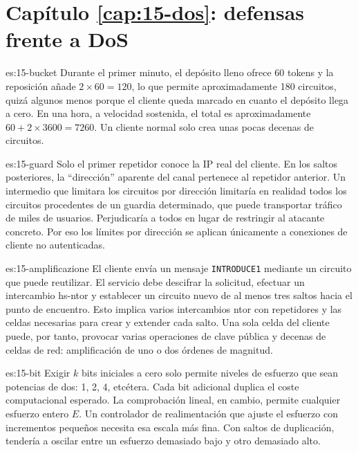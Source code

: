 \section*{Capítulo \ref{cap:15-dos}: defensas frente a DoS}

\begin{soluzione}{es:15-bucket}
Durante el primer minuto, el depósito lleno ofrece 60 tokens y la reposición añade $2\times60=120$, lo que permite aproximadamente 180 circuitos, quizá algunos menos porque el cliente queda marcado en cuanto el depósito llega a cero. En una hora, a velocidad sostenida, el total es aproximadamente $60+2\times3600=7260$. Un cliente normal solo crea unas pocas decenas de circuitos.
\end{soluzione}

\begin{soluzione}{es:15-guard}
Solo el primer repetidor conoce la IP real del cliente. En los saltos posteriores, la \enquote{dirección} aparente del canal pertenece al repetidor anterior. Un intermedio que limitara los circuitos por dirección limitaría en realidad todos los circuitos procedentes de un guardia determinado, que puede transportar tráfico de miles de usuarios. Perjudicaría a todos en lugar de restringir al atacante concreto. Por eso los límites por dirección se aplican únicamente a conexiones de cliente no autenticadas.
\end{soluzione}

\begin{soluzione}{es:15-amplificazione}
El cliente envía un mensaje \texttt{INTRODUCE1} mediante un circuito que puede reutilizar. El servicio debe descifrar la solicitud, efectuar un intercambio hs-ntor y establecer un circuito nuevo de al menos tres saltos hacia el punto de encuentro. Esto implica varios intercambios ntor con repetidores y las celdas necesarias para crear y extender cada salto. Una sola celda del cliente puede, por tanto, provocar varias operaciones de clave pública y decenas de celdas de red: amplificación de uno o dos órdenes de magnitud.
\end{soluzione}

\begin{soluzione}{es:15-bit}
Exigir $k$ bits iniciales a cero solo permite niveles de esfuerzo que sean potencias de dos: 1, 2, 4, etcétera. Cada bit adicional duplica el coste computacional esperado. La comprobación lineal, en cambio, permite cualquier esfuerzo entero $E$. Un controlador de realimentación que ajuste el esfuerzo con incrementos pequeños necesita esa escala más fina. Con saltos de duplicación, tendería a oscilar entre un esfuerzo demasiado bajo y otro demasiado alto.
\end{soluzione}

